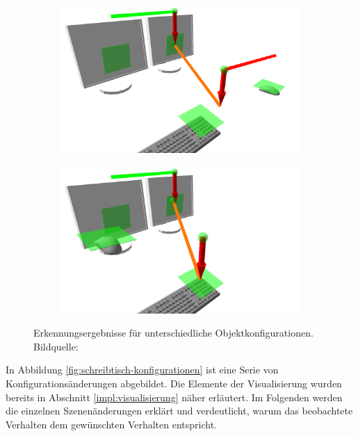 \begin{figure}
\begin{center}
\begin{subfigure}[b]{.3\textwidth}
  \end{subfigure}
  \begin{subfigure}[b]{.3\textwidth}
    \includegraphics[width=1\linewidth]{bilder/paper_fotos/s13.png}
  \end{subfigure}
  \begin{subfigure}[b]{.3\textwidth}
    \includegraphics[width=1\linewidth]{bilder/paper_fotos/s15.png}
  \end{subfigure}
  \caption{Erkennungsergebnisse für unterschiedliche Objektkonfigurationen. Bildquelle: \cite{P.MeissnerandR.RecklingandR.JaekelandS.R.Schmidt-RohrandR.Dillmann2013}}
  \label{fig:schreibtisch-konfigurationen}
 \end{center}
\end{figure}

In Abbildung \vref{fig:schreibtisch-konfigurationen} ist eine Serie von Konfigurationsänderungen abgebildet.
Die Elemente der Visualisierung wurden bereits in Abschnitt \vref{impl:visualisierung} näher erläutert.
Im Folgenden werden die einzelnen Szenenänderungen erklärt und verdeutlicht, warum das beobachtete Verhalten dem gewünschten Verhalten entspricht.

